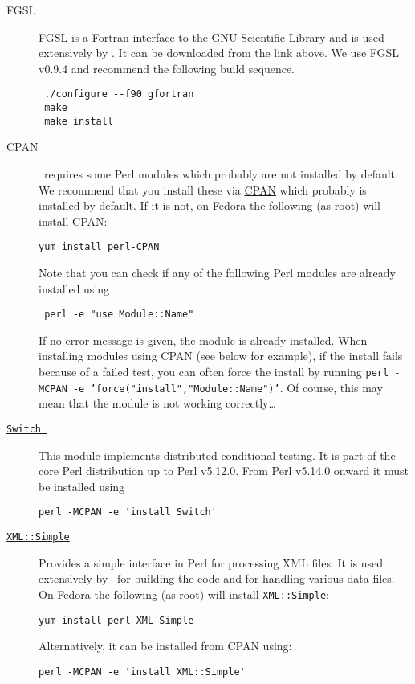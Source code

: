 \begin{description}
\item [FGSL] \href{http://www.lrz-muenchen.de/services/software/mathematik/gsl/fortran/}{FGSL} is a Fortran interface to the GNU Scientific Library and is used extensively by \glc. It can be downloaded from the link above. We use FGSL v0.9.4 and recommend the following build sequence. 
\begin{verbatim}
 ./configure --f90 gfortran
 make
 make install
\end{verbatim}

\item [CPAN] \glc\ requires some Perl modules which probably are not installed by default. We recommend that you install these via \href{http://www.cpan.org/}{CPAN} which probably is installed by default. If it is not, on Fedora the following (as root) will install CPAN:
\begin{verbatim}
yum install perl-CPAN
\end{verbatim}
Note that you can check if any of the following Perl modules are already installed using
\begin{verbatim}
 perl -e "use Module::Name"
\end{verbatim}
If no error message is given, the module is already installed. When installing modules using CPAN (see below for example), if the install fails because of a failed test, you can often force the install by running {\tt perl -MCPAN -e 'force("install","Module::Name")'}. Of course, this may mean that the module is not working correctly\ldots

\item [\href{http://search.cpan.org/~rgarcia/Switch-2.16/Switch.pm}{{\tt Switch }}] This module implements distributed conditional testing. It is part of the core Perl distribution up to Perl v5.12.0. From Perl v5.14.0 onward it must be installed using
\begin{verbatim}
perl -MCPAN -e 'install Switch'
\end{verbatim}

\item [\href{http://search.cpan.org/~grantm/XML-Simple-2.18/lib/XML/Simple.pm}{{\tt XML::Simple}}] Provides a simple interface in Perl for processing XML files. It is used extensively by \glc\ for building the code and for handling various data files. On Fedora the following (as root) will install {\tt XML::Simple}:
\begin{verbatim}
yum install perl-XML-Simple
\end{verbatim}
Alternatively, it can be installed from CPAN using:
\begin{verbatim}
perl -MCPAN -e 'install XML::Simple'
\end{verbatim}


\end{description}

